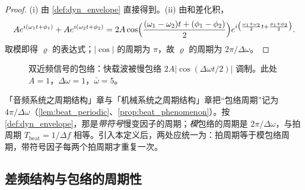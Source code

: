 \begin{proof}
(i) 由 \cref{def:dyn_envelope} 直接得到。(ii) 由和差化积，
\[
Ae^{i(\omega_1t+\phi_1)}+Ae^{i(\omega_2t+\phi_2)}
=2A\cos\Bigl(\frac{(\omega_1-\omega_2)t+(\phi_1-\phi_2)}{2}\Bigr)e^{i\bigl(\frac{\omega_1+\omega_2}{2}t+\frac{\phi_1+\phi_2}{2}\bigr)}.
\]
取模即得 $\varrho$ 的表达式；$|\cos|$ 的周期为 $\pi$，故 $\varrho$ 的周期为 $2\pi/\Delta\omega$。
\end{proof}

\begin{figure}[htbp]
\centering
{}
\caption{双近频信号的包络：快载波被慢包络 $2A|\cos(\Delta\omega t/2)|$ 调制。此处 $A=1$，$\Delta\omega=1$，$\bar\omega=5$。}
\label{fig:dyn_envelope_beat}
\end{figure}

\begin{remark}\label{rem:dyn_envelope_beat_convention}
「音频系统之周期结构」章与「机械系统之周期结构」章把“包络周期”记为 $4\pi/\Delta\omega$（\cref{lem:beat_periodic}、\cref{prop:beat_phenomenon}）。按 \cref{def:dyn_envelope}，那是\emph{带符号}慢变因子的周期；\emph{模}包络的周期是 $2\pi/\Delta\omega$，与拍周期 $T_{\text{beat}}=1/\Delta f$ 相等。引入本定义后，两处应统一为：拍周期等于模包络周期，带符号因子每两个拍周期才重复一次。
\end{remark}

\subsection{差频结构与包络的周期性}

